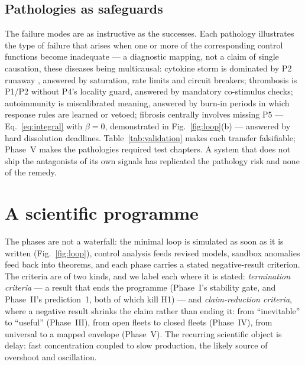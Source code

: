 \documentclass[twoside,twocolumn,usenatbib]{mnras}
\begin{document}
\subsection{Pathologies as safeguards}
\label{sec:pathologies}

The failure modes are as instructive as the successes. Each pathology
illustrates the type of failure that arises when one or more of the
corresponding control functions become inadequate --- a diagnostic
mapping, not a claim of single causation, these diseases being
multicausal: cytokine storm is dominated by P2 runaway
\citep{tisoncik2012}, answered by saturation, rate limits and circuit
breakers; thrombosis is P1/P2 without P4's locality guard, answered by
mandatory co-stimulus checks; autoimmunity is miscalibrated meaning,
answered by burn-in periods in which response rules are learned or
vetoed; fibrosis centrally involves missing P5 ---
Eq.~\ref{eq:integral} with $\beta = 0$, demonstrated in
Fig.~\ref{fig:loop}(b) --- answered by hard dissolution deadlines. Table~\ref{tab:validation}
makes each transfer falsifiable; Phase~V makes the pathologies required
test chapters. A system that does not ship the antagonists of its own
signals has replicated the pathology risk and none of the remedy.

\section{A scientific programme}
\label{sec:programme}

The phases are not a waterfall: the minimal loop is simulated as soon as
it is written (Fig.~\ref{fig:loop}), control analysis feeds revised
models, sandbox anomalies feed back into theorems, and each phase
carries a stated negative-result criterion. The criteria are of two
kinds, and we label each where it is stated: \emph{termination
criteria} --- a result that ends the programme (Phase~I's stability
gate, and Phase~II's prediction~1, both of which kill H1) --- and
\emph{claim-reduction criteria}, where a negative result shrinks the
claim rather than ending it: from ``inevitable'' to ``useful''
(Phase~III), from open fleets to closed fleets (Phase~IV), from
universal to a mapped envelope (Phase~V). The recurring scientific object is delay: fast
concentration coupled to slow production, the
likely source of overshoot and oscillation.
\end{document}
